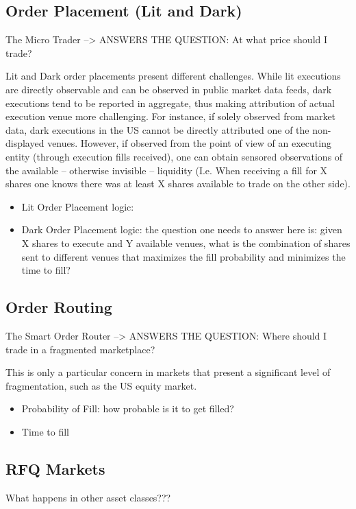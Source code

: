 \subsection{Order Placement (Lit and Dark)}

The Micro Trader --> ANSWERS THE QUESTION: At what price should I trade?

Lit and Dark order placements present different challenges. While lit executions are directly observable and can be observed in public market data feeds, dark executions tend to be reported in aggregate, thus making attribution of actual execution venue more challenging. For instance, if solely observed from market data, dark executions in the US cannot be directly attributed one of the non-displayed venues. However, if observed from the point of view of an executing entity (through execution fills received), one can obtain sensored observations of the available -- otherwise invisible -- liquidity (I.e. When receiving a fill for X shares one knows there was at least X shares available to trade on the other side).

\begin{itemize}
\item Lit Order Placement logic:

\item Dark Order Placement logic: the question one needs to answer here is: given X shares to execute and Y available venues, what is the combination of shares sent to different venues that maximizes the fill probability and minimizes the time to fill?

\end{itemize}


\subsection{Order Routing}

The Smart Order Router --> ANSWERS THE QUESTION: Where should I trade in a fragmented marketplace?

This is only a particular concern in markets that present a significant level of fragmentation, such as the US equity market. 

\begin{itemize}
\item Probability of Fill: how probable is it to get filled? 

\item Time to fill
\end{itemize}


\subsection{RFQ Markets}
What happens in other asset classes???